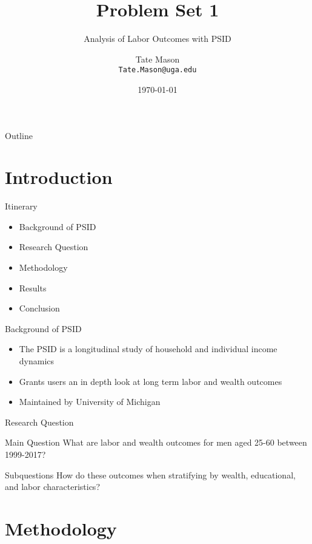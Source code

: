 \documentclass{beamer}
\title[Short Title]{Problem Set 1}
\subtitle{Analysis of Labor Outcomes with PSID}
\author[Your Name]{Tate Mason \\ \smallskip \texttt{Tate.Mason@uga.edu}}
\institute[Your Univ.]{Munro Godfrey Sr. Department of Economics \\ University of Georgia}
\date{\today} %
\begin{document}
\begin{frame}
  \titlepage
\end{frame}

\begin{frame}{Outline}
  \tableofcontents
\end{frame}

\section{Introduction}

\begin{frame}{Itinerary}
  \begin{itemize}
    \item Background of PSID
    \item Research Question
    \item Methodology
    \item Results
    \item Conclusion
  \end{itemize}
\end{frame}

\begin{frame}{Background of PSID}
  \begin{itemize}
    \item The PSID is a longitudinal study of household and individual income dynamics 
    \item Grants users an in depth look at long term labor and wealth outcomes 
    \item Maintained by University of Michigan
  \end{itemize}
\end{frame}

\begin{frame}{Research Question}
  \begin{block}{Main Question}
    What are labor and wealth outcomes for men aged 25-60 between 1999-2017?
  \end{block}
  \pause
  \begin{exampleblock}{Subquestions}
    How do these outcomes when stratifying by wealth, educational, and labor 
    characteristics?
  \end{exampleblock}
\end{frame}

\section{Methodology}
\end{document}
